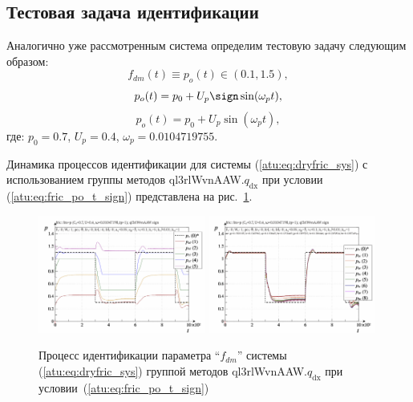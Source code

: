 

\subsection{Тестовая задача идентификации }   %

Аналогично уже рассмотренным система
определим тестовую задачу следующим образом:
\[
  f_{dm}(t) \equiv p_o(t) \in (0.1, 1.5),
\]
%
\begin{equation}
  p_o(t) = p_0 +  U_{p} \sign \sin( \omega_{p} t ),
  \label{atu:eq:fric_po_t_sign}
\end{equation}
%
%
\begin{equation}
  p_o(t) = p_0 +  U_{p} \sin( \omega_{p} t ),
  \label{atu:eq:fric_po_t_sin}
\end{equation}
%
где:
$p_0 = 0.7$, $U_p=0.4$, $\omega_p=0.0104719755$.

Динамика процессов идентификации для системы (\ref{atu:eq:dryfric_sys})
с использованием группы методов ql3rlWvnAAW.$q_\mathrm{dx}$
при условии (\ref{atu:eq:fric_po_t_sign})
представлена на рис.~\ref{atu:f:fric_id_ql3rlWvnAAW_q_dx_sign}.


\begin{figure}[htb!]
  \centerline{
    \includegraphics[width=0.49\textwidth]{p/cha/fric/ql3rlWvnAAW/fric_id-p_t_pi_ql3rlWvnAAW_sign.png}
    \hfill
    \includegraphics[width=0.49\textwidth]{p/cha/fric/ql3rlWvnAAW/fric_id-p_t_p_ql3rlWvnAAW_sign.png}
  }
  \caption{Процесс идентификации параметра ``$f_{dm}$'' системы (\ref{atu:eq:dryfric_sys}) группой методов ql3rlWvnAAW.$q_\mathrm{dx}$ при условии~(\ref{atu:eq:fric_po_t_sign})}
  \label{atu:f:fric_id_ql3rlWvnAAW_q_dx_sign}
\end{figure}

